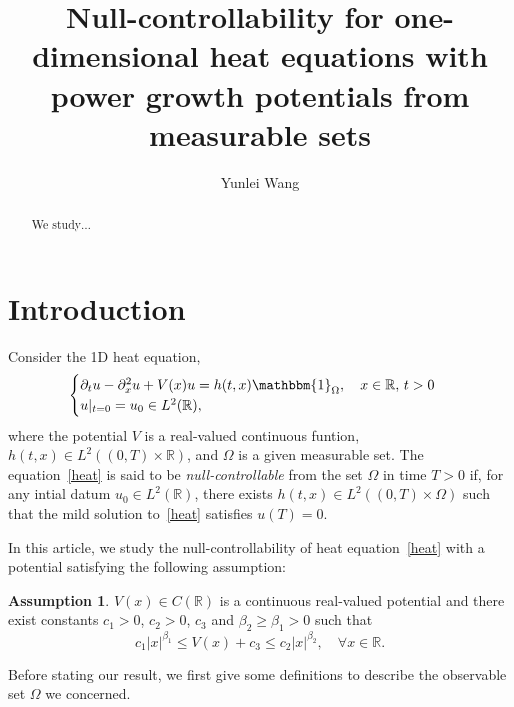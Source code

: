 \documentclass{amsart}
\newcommand\R{\ensuremath{\mathbb{R}}}
\newcommand{\un}{\ensuremath{\mathbbm{1}}}
\theoremstyle{definition}
\newtheorem{assumption}[theorem]{Assumption}
\begin{document}
\title[Null-controllability for 1D heat equation]{Null-controllability for one-dimensional heat equations with power growth potentials from measurable sets}
\author[Y. Wang]{Yunlei Wang}


\maketitle
\begin{abstract}
	We study$\ldots$
\end{abstract}

\tableofcontents

\section{Introduction}

Consider the 1D heat equation,
\begin{equation}
	\begin{cases}
	\partial_t u-\partial_x^2 u +V(x) u=h(t,x)\un_{\Omega},\quad x\in \R,\,t>0\\
	u|_{t=0}=u_0 \in L^2(\R),\label{heat}
	\end{cases}
\end{equation}
where the potential $V$ is a real-valued continuous funtion, $h(t,x)\in L^2\left( (0,T)\times \R \right) $, and $\Omega$ is a given measurable set. The equation~\eqref{heat} is said to be \textit{null-controllable} from the set $\Omega$ in time $T>0$ if, for any intial datum $u_0 \in L^2(\R)$, there exists $h(t,x)\in L^2\left( (0,T)\times \Omega \right) $ such that the mild solution to~\eqref{heat} satisfies $u(T)=0$. 



In this article, we study the null-controllability of heat equation~\eqref{heat} with a potential satisfying the following assumption: 
\begin{assumption}\label{assump1}
	$V(x)\in C(\R)$ is a continuous real-valued potential and there exist constants $c_1> 0$, $c_2> 0$, $c_3$ and  $\beta_2\ge \beta_1> 0$ such that
	\[
	c_1|x|^{\beta_1}\le V(x)+c_3\le c_2|x|^{\beta_2}, \quad \forall x\in \R.
	\] 
\end{assumption}
Before stating our result, we first give some definitions to describe the observable set $\Omega$ we concerned.
\end{document}
